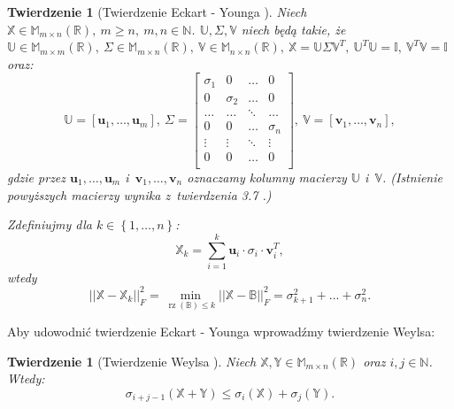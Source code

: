 \documentclass[12pt,a4paper]{report}
\newtheorem{tw}[df]{Twierdzenie}
\newcommand{\set}[1]{\left\lbrace {#1} \right\rbrace}
\newcommand{\setR}{\mathbb{R}}
\newcommand{\setN}{\mathbb{N}}
\newcommand{\rz}[1]{\operatorname{rz}\left({#1} \right)}
\begin{document}
\begin{tw}[Twierdzenie Eckart - Younga {\citep{tsvdalra, ulafiir}}]%
Niech $\mathbb{X} \in \mathbb{M}_{m \times n}(\setR),\: m \geq n, \:  m,n \in \setN$. $\mathbb{U}, \Sigma, \mathbb{V}$ niech będą takie, że $\mathbb{U} \in \mathbb{M}_{m \times m}(\setR), \: \Sigma \in \mathbb{M}_{m \times n}(\setR), \: \mathbb{V} \in \mathbb{M}_{n \times n}(\setR), \: \mathbb{X}=\mathbb{U}\Sigma \mathbb{V}^T, \: \mathbb{U}^T \mathbb{U} = \mathbb{I}, \: \mathbb{V}^T \mathbb{V} =\mathbb{I}$ oraz:
$$
\mathbb{U} = [\mathbf{u}_1, \ldots, \mathbf{u}_m], \: \Sigma = \left[
        \begin{array}{cccc}
         \sigma_{1} & 0 & \ldots & 0 \\
         0 & \sigma_{2} & \ldots & 0 \\
         \ldots & \ldots& \ddots & \ldots \\
         0 & 0 & \ldots & \sigma_{n} \\
         \vdots & \vdots & \ddots & \vdots \\
         0 & 0 & \ldots & 0 \\
         \end{array}
      \right], \: \mathbb{V} = [\mathbf{v}_1, \ldots, \mathbf{v}_n],
$$
gdzie przez $\mathbf{u}_1, \ldots, \mathbf{u}_m$ i~$\mathbf{v}_1, \ldots, \mathbf{v}_n$ oznaczamy kolumny macierzy $\mathbb{U}$ i~$\mathbb{V}$. (Istnienie powyższych macierzy wynika z~twierdzenia 3.7 .) 

Zdefiniujmy dla $k \in \set{1, \ldots, n}$:
$$
\mathbb{X}_k = \sum_{i=1}^k \mathbf{u}_i\cdot \sigma_{i} \cdot \mathbf{v}_i^T,
$$
wtedy
$$
||\mathbb{X} - \mathbb{X}_k||_F^2 = \min \limits_{\rz{\mathbb{B}} \leqslant k } ||\mathbb{X} - \mathbb{B}||_F^2 = \sigma_{k+1}^2 + ... + \sigma_{n}^2.
$$
\end{tw}

Aby udowodnić twierdzenie Eckart - Younga wprowadźmy twierdzenie Weylsa:

\begin{tw}[Twierdzenie Weylsa {\citep[Tw. 4.17]{tsvdalra}}]
Niech $\mathbb{X}, \mathbb{Y} \in \mathbb{M}_{m \times n}(\setR)$ oraz $i,j \in \setN$. Wtedy:
$$
\sigma_{i+j-1}(\mathbb{X} + \mathbb{Y}) \leq \sigma_i(\mathbb{X}) + \sigma_j(\mathbb{Y}).
$$
\end{tw}
\end{document}
